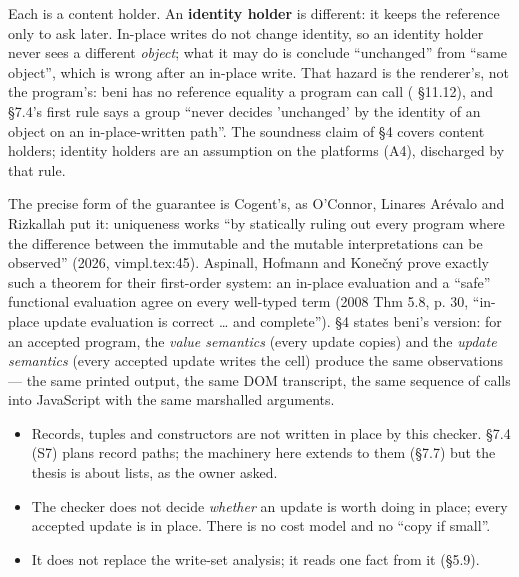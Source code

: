 Each is a content holder. An \textbf{identity holder} is different: it keeps the reference only to ask \code{===} later. In-place writes do not change identity, so an identity holder never sees a different \emph{object}; what it may do is conclude “unchanged” from “same object”, which is wrong after an in-place write. That hazard is the renderer's, not the program's: beni has no reference equality a program can call ( §11.12), and  §7.4's first rule says a group “never decides 'unchanged' by the identity of an object on an in-place-written path”. The soundness claim of §4 covers content holders; identity holders are an assumption on the platforms (A4), discharged by that rule.


The precise form of the guarantee is Cogent's, as O'Connor, Linares Arévalo and Rizkallah put it: uniqueness works “by statically ruling out every program where the difference between the immutable and the mutable interpretations can be observed” (2026, vimpl.tex:45). Aspinall, Hofmann and Konečný prove exactly such a theorem for their first-order system: an in-place evaluation and a “safe” functional evaluation agree on every well-typed term (2008 Thm 5.8, p. 30, “in-place update evaluation is correct … and complete”). §4 states beni's version: for an accepted program, the \emph{value semantics} (every update copies) and the \emph{update semantics} (every accepted update writes the cell) produce the same observations — the same printed output, the same DOM transcript, the same sequence of calls into JavaScript with the same marshalled arguments.


\begin{itemize}
\item Records, tuples and constructors are not written in place by this checker.  §7.4 (S7) plans record paths; the machinery here extends to them (§7.7) but the thesis is about lists, as the owner asked.
\item The checker does not decide \emph{whether} an update is worth doing in place; every accepted update is in place. There is no cost model and no “copy if small”.
\item It does not replace the write-set analysis; it reads one fact from it (§5.9).
\end{itemize}
